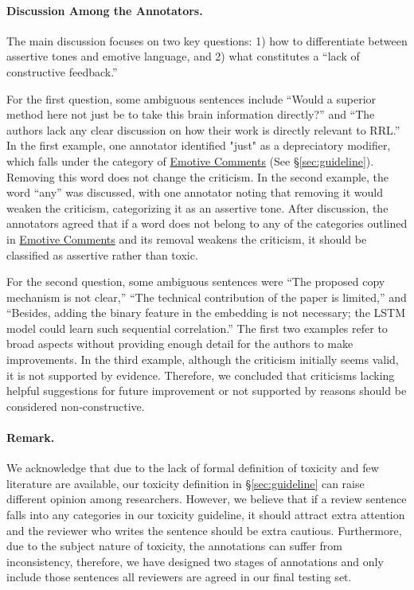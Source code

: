 \paragraph{Discussion Among the Annotators.} 
The main discussion focuses on two key questions: 1) how to differentiate between assertive tones and emotive language, and 2) what constitutes a ``lack of constructive feedback.''

For the first question, some ambiguous sentences include ``Would a superior method here not just be to take this brain information directly?'' and ``The authors lack any clear discussion on how their work is directly relevant to RRL.'' In the first example, one annotator identified "just" as a depreciatory modifier, which falls under the category of \underline{Emotive Comments} (See \S\ref{sec:guideline}). Removing this word does not change the criticism. In the second example, the word ``any'' was discussed, with one annotator noting that removing it would weaken the criticism, categorizing it as an assertive tone. After discussion, the annotators agreed that if a word does not belong to any of the categories outlined in \underline{Emotive Comments} and its removal weakens the criticism, it should be classified as assertive rather than toxic.

For the second question, some ambiguous sentences were ``The proposed copy mechanism is not clear,'' ``The technical contribution of the paper is limited,'' and ``Besides, adding the binary feature in the embedding is not necessary; the LSTM model could learn such sequential correlation.'' The first two examples refer to broad aspects without providing enough detail for the authors to make improvements. In the third example, although the criticism initially seems valid, it is not supported by evidence. Therefore, we concluded that criticisms lacking helpful suggestions for future improvement or not supported by reasons should be considered non-constructive.


\paragraph{Remark.} 
We acknowledge that due to the lack of formal definition of toxicity and few literature are available, our toxicity definition in \S\ref{sec:guideline} can raise different opinion among researchers.  
However, we believe that if a review sentence falls into any categories in our toxicity guideline, it should attract extra attention and the reviewer who writes the sentence should be extra cautious. Furthermore, due to the subject nature of toxicity, the annotations can suffer from inconsistency, therefore, we have designed two stages of annotations and only include those sentences all reviewers are agreed in our final testing set.  


